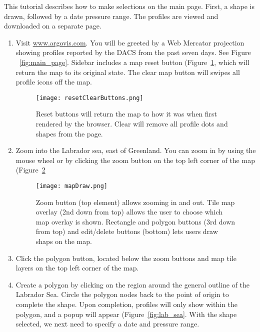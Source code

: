 This tutorial describes how to make selections on the main page. First, a shape is drawn, followed by a date pressure range. The profiles are viewed and downloaded on a separate page.

\begin{enumerate}
\item Visit \url{www.argovis.com}. You will be greeted by a Web Mercator projection showing profiles reported by the DACS from the past seven days. See Figure ~\ref{fig:main_page}. Sidebar includes a map reset button (Figure~\ref{fig:reset_clear_buttons}, which will return the map to its original state. The clear map button will swipes all profile icons off the map.

\begin{figure}[H]
\begin{minipage}{6in}
\centering
\texttt{[image: resetClearButtons.png]}
\caption{\label{fig:reset_clear_buttons} Reset buttons will return the map to how it was when first rendered by the browser. Clear will remove all profile dots and shapes from the page.}
\end{minipage}
\end{figure}

\item Zoom into the Labrador sea, east of Greenland. You can zoom in by using the mouse wheel or by clicking the zoom button on the top left corner of the map (Figure~\ref{fig:map_draw}

\begin{figure}[H]
\begin{minipage}{6in}
\centering
\texttt{[image: mapDraw.png]}
\caption{\label{fig:map_draw} Zoom button (top element) allows zooming in and out. Tile map overlay (2nd down from top) allows the user to choose which map overlay is shown. Rectangle and polygon buttons (3rd down from top) and edit/delete buttons (bottom) lets users draw shaps on the map.}
\end{minipage}
\end{figure}

\item Click the polygon button, located below the zoom buttons and map tile layers on the top left corner of the map.

\item Create a polygon by clicking on the region around the general outline of the Labrador Sea. Circle the polygon nodes back to the point of origin to complete the shape. Upon completion, profiles will only show within the polygon, and a popup will appear (Figure~\ref{fig:lab_sea}. With the shape selected, we next need to specify a date and pressure range.


\end{enumerate}

